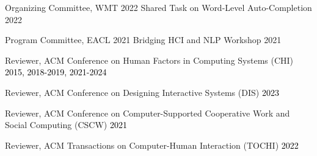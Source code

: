 \vspace{-1mm}








\thispagestyle{secondstyle}

\vspace{-2mm}



\vspace{-2mm}



\pagebreak

\vspace{-2mm}



\vspace{-2mm}





Organizing Committee, WMT 2022 Shared Task on Word-Level Auto-Completion \hfill 2022

Program Committee, EACL 2021 Bridging HCI and NLP Workshop \hfill 2021

Reviewer, ACM Conference on Human Factors in Computing Systems (CHI) \hfill \textcolor{black}{2015, 2018-2019, 2021-2024}

Reviewer, ACM Conference on Designing Interactive Systems (DIS) \hfill \textcolor{black}{2023}

Reviewer, ACM Conference on Computer-Supported Cooperative Work and Social Computing (CSCW) \hfill \textcolor{black}{2021}

Reviewer, ACM Transactions on Computer-Human Interaction (TOCHI) \hfill \textcolor{black}{2022}

